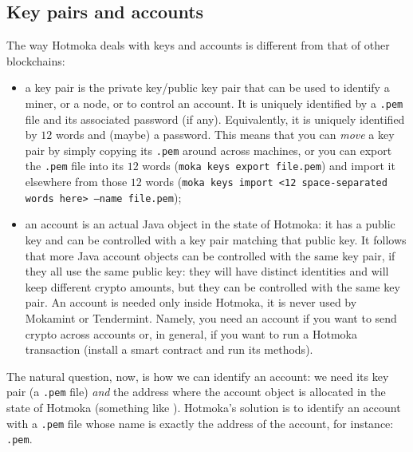 \subsection{Key pairs and accounts}\label{subsec:keypairs_and_accounts}

The way Hotmoka deals with keys and accounts is different from that of other blockchains:
%
\begin{itemize}
\item a key pair is the private key/public key pair that can be used to identify a miner, or
	a node, or to control an account. It is uniquely identified by a \texttt{.pem} file and
	its associated password (if any). Equivalently, it is uniquely identified by $12$ words and
	(maybe) a password. This means that you can \emph{move} a key pair by simply copying its
	\texttt{.pem} around across machines, or you can export the \texttt{.pem} file into its
	$12$ words (\texttt{moka keys export file.pem})
	and import it elsewhere from those $12$ words
	(\texttt{moka keys import <12 space-separated words here> --name file.pem});
\item an account is an actual Java object in the state
	of Hotmoka: it has a public key and can be controlled with a key pair matching that public key.
	It follows that more Java account objects can be controlled with the same key pair,
	if they all use the same public key: they will have distinct identities and will keep
	different crypto amounts, but they can be controlled with the same key pair.
	An account is needed only inside Hotmoka, it is never
	used by Mokamint or Tendermint. Namely, you need an account if you want to send crypto across
	accounts or, in general, if you want to run a Hotmoka transaction (install a smart contract
	and run its methods).
\end{itemize}
%
The natural question, now, is how we can identify an account: we need its key pair
(a \texttt{.pem} file) \emph{and} the address where the account object is allocated in the state
of Hotmoka (something like \texttt{\gameteShort{}}). Hotmoka's solution is
to identify an account with a \texttt{.pem} file whose name is exactly the address of the
account, for instance: \texttt{\gameteShort{}.pem}.

